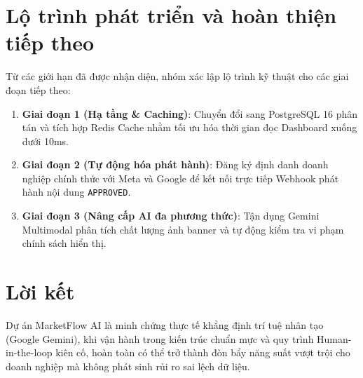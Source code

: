 \section{Lộ trình phát triển và hoàn thiện tiếp theo}

Từ các giới hạn đã được nhận diện, nhóm xác lập lộ trình kỹ thuật cho các giai đoạn tiếp theo:
\begin{enumerate}[noitemsep,topsep=2pt]
  \item \textbf{Giai đoạn 1 (Hạ tầng \& Caching)}: Chuyển đổi sang PostgreSQL 16 phân tán và tích hợp Redis Cache nhằm tối ưu hóa thời gian đọc Dashboard xuống dưới 10ms.
  \item \textbf{Giai đoạn 2 (Tự động hóa phát hành)}: Đăng ký định danh doanh nghiệp chính thức với Meta và Google để kết nối trực tiếp Webhook phát hành nội dung \texttt{APPROVED}.
  \item \textbf{Giai đoạn 3 (Nâng cấp AI đa phương thức)}: Tận dụng Gemini Multimodal phân tích chất lượng ảnh banner và tự động kiểm tra vi phạm chính sách hiển thị.
\end{enumerate}

\section{Lời kết}

Dự án MarketFlow AI là minh chứng thực tế khẳng định trí tuệ nhân tạo (Google Gemini), khi vận hành trong kiến trúc chuẩn mực và quy trình Human-in-the-loop kiên cố, hoàn toàn có thể trở thành đòn bẩy năng suất vượt trội cho doanh nghiệp mà không phát sinh rủi ro sai lệch dữ liệu.
